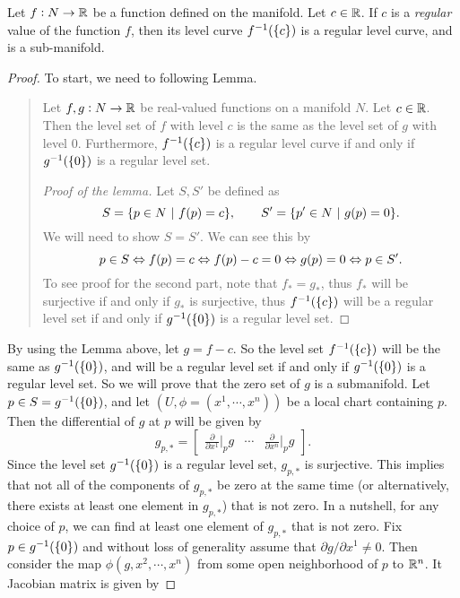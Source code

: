 \begin{proposition}
	Let $ f:N \to \mathbb{R} $ be a function defined on the manifold. Let $ c \in \mathbb{R} $. If $ c $ is a \emph{regular} value of the function $ f $, then its level curve $ f^{-1}(\{c\}) $ is a regular level curve, and is a sub-manifold.
\end{proposition}
\begin{proof}
	To start, we need to following Lemma.
	\begin{quote}
		\begin{lemma}
			Let $ f,g : N \to \mathbb{R}  $ be real-valued functions on a manifold $ N $. Let $ c \in \mathbb{R} $. Then the level set of $ f $ with level $ c $ is the same as the level set of $ g $ with level $ 0 $. Furthermore, $ f^{-1}(\{c\}) $ is a regular level curve if and only if $ g^{-1}(\{0\}) $ is a regular level set.
		\end{lemma}
		\begin{proof}[Proof of the lemma]
			Let $ S, S' $ be defined as
			\[ S = \{p \in N\ |\ f(p) = c\}, \qquad S' = \{p'\in N\ |\ g(p) = 0\}. \]
			We will need to show $ S = S' $. We can see this by
			\[ p \in S \Leftrightarrow f(p) = c \Leftrightarrow f(p)-c =0 \Leftrightarrow g(p)=0 \Leftrightarrow p \in S'. \]
			To see proof for the second part, note that $ f_* = g_* $,  thus $ f_* $ will be surjective if and only if $ g_* $ is surjective, thus $ f^{-1}(\{c\}) $ will be a regular level set if and only if $ g^{-1}(\{0\}) $ is a regular level set.
		\end{proof}
	\end{quote}
	By using the Lemma above, let $ g = f-c $. So the level set $ f^{-1}(\{c\}) $ will be the same as $ g^{-1}(\{0\}) $, and will be a regular level set if and only if $ g^{-1}(\{0\}) $ is a regular level set. So we will prove that the zero set of $ g $ is a submanifold. Let $ p \in S = g^{-1}(\{0\}) $, and let $ (U,\phi=(x^1,\cdots,x^n)) $ be a local chart containing $ p $. Then the differential of $ g $ at $ p $ will be given by
	\[ g_{p,*} = \begin{bmatrix}
		\frac{\partial}{\partial  x^1}\big|_{p} g & \cdots & \frac{\partial}{\partial  x^n}\big|_{p} g
	\end{bmatrix} .\]
	Since the level set $ g^{-1}(\{0\}) $ is a regular level set, $ g_{p,*} $ is surjective. This implies that not all of the components of $ g_{p,*} $ be zero at the same time (or alternatively, there exists at least one element in $ g_{p,*} $) that is not zero. In a nutshell, for any choice of $ p $, we can find at least one element of $ g_{p,*} $ that is not zero. Fix $ p \in g^{-1}(\{0\}) $ and without loss of generality assume that $ \partial g/\partial x^1 \neq 0 $. Then consider the map $ \phi(g,x^2,\cdots, x^n) $ from some open neighborhood of $ p $ to $ \mathbb{R}^n $. It Jacobian matrix is given by

\end{proof}
